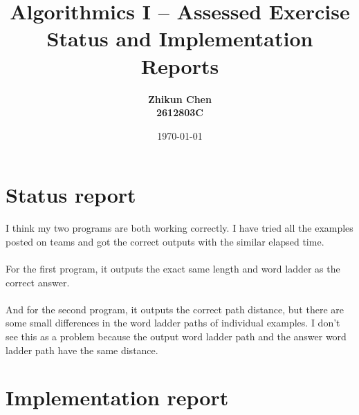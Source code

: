 \documentclass[11pt]{article}
\title{Algorithmics I --  Assessed Exercise\\ \vspace{4mm} 
Status and Implementation Reports}
\author{\bf Zhikun Chen\\ \bf 2612803C}
\date{\today}
\begin{document}
\maketitle

\section*{Status report}

I think my two programs are both working correctly. I have tried all the examples posted on teams and got the correct outputs with the similar elapsed time. \\ \\
For the first program, it outputs the exact same length and word ladder as the correct answer. \\ \\
And for the second program, it outputs the correct path distance, but there are some small differences in the word ladder paths of individual examples. I don't 
see this as a problem because the output word ladder path and the answer word ladder path have the same distance.\\

\section*{Implementation report}
\end{document}
